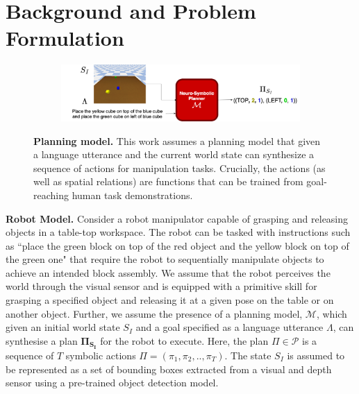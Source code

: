 \section{Background and Problem Formulation}\label{sec:problem}
\begin{figure}[t!]
    \begin{subfigure}{1.0\hsize}
         \centering    
         \includegraphics[scale=0.25]{figures/nsrm.png}
    \end{subfigure}
    \caption{
        \footnotesize{
            \textbf{Planning model.} 
            This work assumes a planning model that given a language utterance and the current world state can synthesize a sequence of actions for manipulation tasks. Crucially, the actions (as well as spatial relations) are functions that can be trained from goal-reaching human task demonstrations. 
        }
    }
    \vspace{-0.15in}
    \label{fig:nsrm}
\end{figure}


\textbf{Robot Model. }
Consider a robot manipulator capable of grasping and releasing objects in a table-top workspace. 
%
The robot can be tasked with instructions such as ``place the green block on top of the red object and the yellow block on top of the green one" that require the robot to sequentially manipulate objects to achieve an intended block assembly. 
%
We assume that the robot perceives the world through the visual sensor and is equipped with a primitive skill for grasping a specified object and releasing it at a given pose on the table or on another object. 
%
Further, we assume the presence of a planning model, $\mathcal{M}$, which given an initial world state $S_I$ and a goal specified as a language utterance $\mathit{\Lambda}$, can synthesise a plan $\mathbf{\Pi_{S_I}}$ for the robot to execute. 
%
Here, the plan $\Pi \in \mathcal{P}$ is a sequence of $T$ symbolic actions $\Pi = (\pi_1, \pi_2, .., \pi_T)$. The state $S_I$ is assumed to be represented as a set of bounding boxes extracted from a visual and depth sensor using a pre-trained object detection model. 

